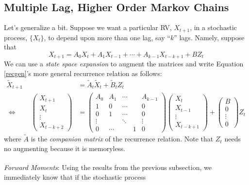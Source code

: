 \documentclass[12pt]{article}
\theoremstyle{plain}
\theoremstyle{definition}
\theoremstyle{remark}
\begin{document}
\newpage
\subsection{Multiple Lag, Higher Order Markov Chains}

Let's generalize a bit.  Suppose we want a particular RV,
${X}_{t+1}$, in a stochastic process, $\{{X}_t\}$, to
depend upon more than one lag, say ``$k$'' lags. Namely, suppose that
\begin{equation}
    \label{recgen}
    {X}_{t+1} = A_0 {X}_t + A_1 {X}_{t-1}
    + \cdots + A_{k-1}{X}_{t-k+1} + B {Z}_t
\end{equation}
We can use a \emph{state space expansion} to augment the matrices
and write Equation \ref{recgen}'s more general recurrence relation
as follows:
\begin{align*}
    \tilde{{X}}_{t+1} &= \tilde{A}_t
	\tilde{{X}}_t + \tilde{B}_t {Z}_t \\
    \Leftrightarrow \qquad
    \begin{pmatrix} {X}_{t+1} \\
	{X}_{t} \\ \vdots \\ {X}_{t-k+2} \end{pmatrix}
	&=
	\begin{pmatrix} A_0 & A_1 & \cdots & & A_{k-1} \\
			1 & 0 & \cdots & & 0 \\
			0 & 1 & \cdots & & 0 \\
			\vdots & & \ddots & & \vdots \\
			0 & \cdots & & 1 & 0
	\end{pmatrix}
	\begin{pmatrix} {X}_{t} \\
	{X}_{t-1} \\ \vdots \\ {X}_{t-k+1} \end{pmatrix}
	+ \begin{pmatrix} B \\ 0 \\ \vdots \\ 0 \end{pmatrix}
	{Z}_t
\end{align*}
where $\tilde{A}$ is the \emph{companion matrix} of the
recurrence relation.
Note that ${Z}_t$ needs no augmenting because it is memoryless.
\\
\\
{\sl Forward Moments}: Using the results from the previous
subsection, we immediately know that if the stochastic process
\end{document}
